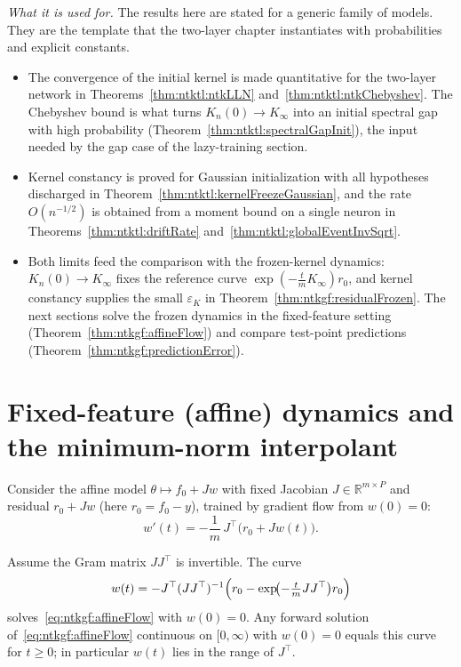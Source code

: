 \begin{remark}
\emph{What it is used for.} The results here are stated for a generic family of models. They are the template that the two-layer chapter instantiates with probabilities and explicit constants.
\begin{itemize}
  \item The convergence of the initial kernel is made quantitative for the two-layer network in Theorems~\ref{thm:ntktl:ntkLLN} and~\ref{thm:ntktl:ntkChebyshev}. The Chebyshev bound is what turns $K_n(0)\to K_\infty$ into an initial spectral gap with high probability (Theorem~\ref{thm:ntktl:spectralGapInit}), the input needed by the gap case of the lazy-training section.
  \item Kernel constancy is proved for Gaussian initialization with all hypotheses discharged in Theorem~\ref{thm:ntktl:kernelFreezeGaussian}, and the rate $O(n^{-1/2})$ is obtained from a moment bound on a single neuron in Theorems~\ref{thm:ntktl:driftRate} and~\ref{thm:ntktl:globalEventInvSqrt}.
  \item Both limits feed the comparison with the frozen-kernel dynamics: $K_n(0)\to K_\infty$ fixes the reference curve $\exp(-\frac tmK_\infty)r_0$, and kernel constancy supplies the small $\varepsilon_K$ in Theorem~\ref{thm:ntkgf:residualFrozen}. The next sections solve the frozen dynamics in the fixed-feature setting (Theorem~\ref{thm:ntkgf:affineFlow}) and compare test-point predictions (Theorem~\ref{thm:ntkgf:predictionError}).
\end{itemize}
\end{remark}


\section{Fixed-feature (affine) dynamics and the minimum-norm interpolant}\label{sec:ntkgf:affine}

Consider the affine model $\theta\mapsto f_0+Jw$ with fixed Jacobian $J\in\mathbb R^{m\times P}$ and residual $r_0+Jw$ (here $r_0=f_0-y$), trained by gradient flow from $w(0)=0$:
\begin{equation}\label{eq:ntkgf:affineFlow}
  w'(t)=-\frac1m\,J^\top\bigl(r_0+Jw(t)\bigr).
\end{equation}

\begin{theorem}\label{thm:ntkgf:affineFlow}
  \leanok
Assume the Gram matrix $JJ^\top$ is invertible. The curve
\[
  w(t)=-J^\top(JJ^\top)^{-1}\Bigl(r_0-\exp\!\bigl(-\tfrac tmJJ^\top\bigr)r_0\Bigr)
\]
solves~\eqref{eq:ntkgf:affineFlow} with $w(0)=0$. Any forward solution of~\eqref{eq:ntkgf:affineFlow} continuous on $[0,\infty)$ with $w(0)=0$ equals this curve for $t\ge0$; in particular $w(t)$ lies in the range of $J^\top$.
\end{theorem}

